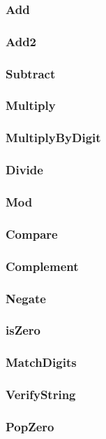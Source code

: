 \subsubsection{Add}
\subsubsection{Add2}
\subsubsection{Subtract}
\subsubsection{Multiply}
\subsubsection{MultiplyByDigit}
\subsubsection{Divide}
\subsubsection{Mod}
\subsubsection{Compare}
\subsubsection{Complement}
\subsubsection{Negate}
\subsubsection{isZero}
\subsubsection{MatchDigits}
\subsubsection{VerifyString}
\subsubsection{PopZero}

